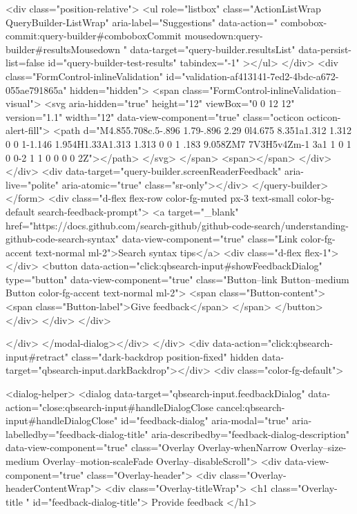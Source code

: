         <div class="position-relative">
                <ul
                  role="listbox"
                  class="ActionListWrap QueryBuilder-ListWrap"
                  aria-label="Suggestions"
                  data-action="
                    combobox-commit:query-builder#comboboxCommit
                    mousedown:query-builder#resultsMousedown
                  "
                  data-target="query-builder.resultsList"
                  data-persist-list=false
                  id="query-builder-test-results"
                  tabindex="-1"
                ></ul>
        </div>
      <div class="FormControl-inlineValidation" id="validation-af413141-7ed2-4bdc-a672-055ae791865a" hidden="hidden">
        <span class="FormControl-inlineValidation--visual">
          <svg aria-hidden="true" height="12" viewBox="0 0 12 12" version="1.1" width="12" data-view-component="true" class="octicon octicon-alert-fill">
    <path d="M4.855.708c.5-.896 1.79-.896 2.29 0l4.675 8.351a1.312 1.312 0 0 1-1.146 1.954H1.33A1.313 1.313 0 0 1 .183 9.058ZM7 7V3H5v4Zm-1 3a1 1 0 1 0 0-2 1 1 0 0 0 0 2Z"></path>
</svg>
        </span>
        <span></span>
</div>    </div>
    <div data-target="query-builder.screenReaderFeedback" aria-live="polite" aria-atomic="true" class="sr-only"></div>
</query-builder></form>
          <div class="d-flex flex-row color-fg-muted px-3 text-small color-bg-default search-feedback-prompt">
            <a target="_blank" href="https://docs.github.com/search-github/github-code-search/understanding-github-code-search-syntax" data-view-component="true" class="Link color-fg-accent text-normal ml-2">Search syntax tips</a>            <div class="d-flex flex-1"></div>
              <button data-action="click:qbsearch-input#showFeedbackDialog" type="button" data-view-component="true" class="Button--link Button--medium Button color-fg-accent text-normal ml-2">  <span class="Button-content">
    <span class="Button-label">Give feedback</span>
  </span>
</button>
          </div>
        </div>
</div>

    </div>
</modal-dialog></div>
  </div>
  <div data-action="click:qbsearch-input#retract" class="dark-backdrop position-fixed" hidden data-target="qbsearch-input.darkBackdrop"></div>
  <div class="color-fg-default">
    
<dialog-helper>
  <dialog data-target="qbsearch-input.feedbackDialog" data-action="close:qbsearch-input#handleDialogClose cancel:qbsearch-input#handleDialogClose" id="feedback-dialog" aria-modal="true" aria-labelledby="feedback-dialog-title" aria-describedby="feedback-dialog-description" data-view-component="true" class="Overlay Overlay-whenNarrow Overlay--size-medium Overlay--motion-scaleFade Overlay--disableScroll">
    <div data-view-component="true" class="Overlay-header">
  <div class="Overlay-headerContentWrap">
    <div class="Overlay-titleWrap">
      <h1 class="Overlay-title " id="feedback-dialog-title">
        Provide feedback
      </h1>
        
